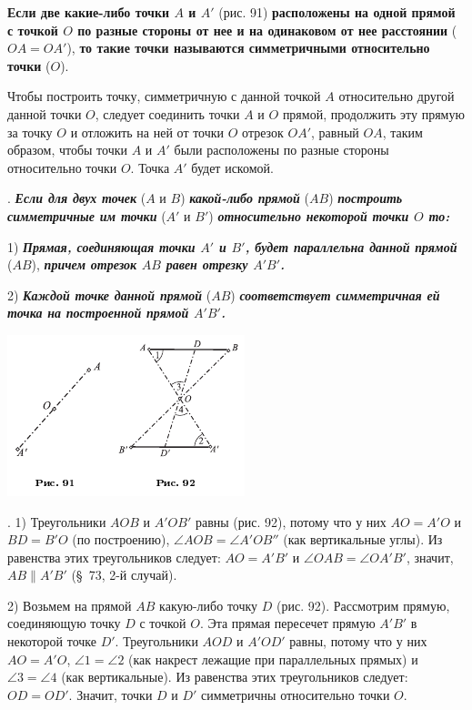 \documentclass[oneside]{book}
\begin{document}
\textbf{Если две какие-либо точки $A$ и $A'$} (рис. 91) \textbf{расположены на одной прямой с точкой $O$ по разные стороны от нее и на одинаковом от нее расстоянии} ($OA=OA'$), \textbf{то такие точки называются симметричными относительно точки} ($O$).

Чтобы построить точку, симметричную с данной точкой $A$ относительно другой данной точки $O$, следует соединить точки $A$ и $O$ прямой, продолжить эту прямую за точку $O$ и отложить на ней от точки $O$ отрезок $OA'$, равный $OA$, таким образом, чтобы точки $A$ и $A'$ были расположены по разные стороны относительно точки $O$.
Точка $A'$ будет искомой.

.
\textbf{\emph{Если для двух точек}} ($A$ и $B$) \textbf{\emph{какой-либо прямой}} ($AB$) \textbf{\emph{построить симметричные им точки}} ($A'$ и $B'$) \textbf{\emph{относительно некоторой точки $O$ то:}}

1) \textbf{\emph{Прямая, соединяющая точки $A'$ и $B'$, будет параллельна данной прямой}} ($AB$), \textbf{\emph{причем отрезок $AB$ равен отрезку $A'B'$.}}

2) \textbf{\emph{Каждой точке данной прямой}} ($AB$) \textbf{\emph{соответствует симметричная ей точка на построенной прямой $A'B'$.}}

\includegraphics{pics/ris-91-92}

.
1) Треугольники $AOB$ и $A'OB'$ равны (рис. 92), потому что у них $AO=A'O$ и $BD=B'O$ (по построению), $\angle AOB=\angle A'OB''$ (как вертикальные углы).
Из равенства этих треугольников следует:
$AO=A'B'$ и $\angle OAB = \angle OA'B'$, значит, $AB\parallel A'B'$ (§~73, 2-й случай).

2) Возьмем на прямой $AB$ какую-либо точку $D$ (рис. 92).
Рассмотрим прямую, соединяющую точку $D$ с точкой $O$.
Эта прямая пересечет прямую $A'B'$ в некоторой точке $D'$.
Треугольники $AOD$ и $A'OD'$ равны, потому что у них $AO=A'O$, $\angle 1 = \angle 2$ (как накрест лежащие при параллельных прямых) и $\angle 3 = \angle 4$ (как вертикальные).
Из равенства этих треугольников следует:
$OD = OD'$.
Значит, точки $D$ и $D'$ симметричны относительно точки $O$.
\end{document}
